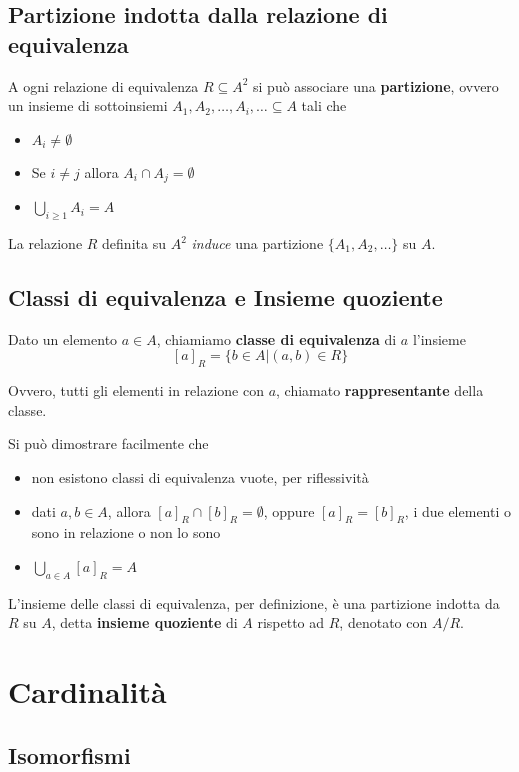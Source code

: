\subsection{Partizione indotta dalla relazione di equivalenza}

A ogni relazione di equivalenza $R \subseteq A^2$ si può associare una \textbf{partizione}, ovvero un insieme di sottoinsiemi $A_{1}, A_{2}, \ldots, A_i, \ldots \subseteq A$ tali che
\begin{itemize}
	\item $A_i \neq \emptyset$
	
    \item Se $i \neq j$ allora $A_i \cap A_j = \emptyset$
	
    \item $\bigcup_{i \geq 1} A_i = A$
\end{itemize}

La relazione $R$ definita su $A^2$ \textit{induce} una partizione $\{A_1, A_2, \dots\}$ su $A$.

\subsection{Classi di equivalenza e Insieme quoziente}
Dato un elemento $a \in A$, chiamiamo \textbf{classe di equivalenza} di $a$ l'insieme
$$ [a]_R = \{b \in A | (a,b) \in R \} $$

Ovvero, tutti gli elementi in relazione con $a$, chiamato \textbf{rappresentante} della classe.

Si può dimostrare facilmente che
\begin{itemize}
	\item non esistono classi di equivalenza vuote, per riflessività
	\item dati $a,b \in A$, allora $[a]_R \cap [b]_R = \emptyset$, oppure $[a]_R = [b]_R$, i due elementi o sono in relazione o non lo sono
	\item $\bigcup_{a \in A} [a]_R = A$
\end{itemize}

L'insieme delle classi di equivalenza, per definizione, è una partizione indotta da $R$ su $A$, detta \textbf{insieme quoziente} di $A$ rispetto ad $R$, denotato con $A / R$.

\section{Cardinalità}

\subsection{Isomorfismi}

